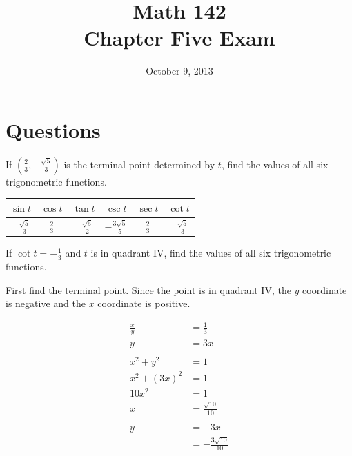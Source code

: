 \documentclass[fleqn,addpoints]{exam}
\author{}
\date{October 9, 2013}
\title{Math 142 \\ Chapter Five Exam}
\begin{document}
  \maketitle


  \section{Questions}

  \begin{questions}
    
    \question[6]
      If $\left( \frac{2}{3}, - \frac{\sqrt{5}}{3} \right)$ is the terminal point determined by $t$, find the values of
      all six trigonometric functions. 
      
      \begin{solution}
        \begin{tabular}[H]{cccccc}
          \toprule
          $\sin t$               & $\cos t$      & $\tan t$               & $\csc t$                 & $\sec t$      & $\cot t$ \\
          \midrule
          $- \frac{\sqrt{5}}{3}$ & $\frac{2}{3}$ & $- \frac{\sqrt{5}}{2}$ & $- \frac{3 \sqrt{5}}{5}$ & $\frac{2}{3}$ & $- \frac{\sqrt{5}}{3}$ \\
          \bottomrule
        \end{tabular}
      \end{solution}

    \question[8]
      If $\cot t = - \frac{1}{3}$ and $t$ is in quadrant IV, find the values of all six trigonometric functions.

      \begin{solution}
        First find the terminal point.  Since the point is in quadrant IV, the $y$ coordinate is negative and the $x$
        coordinate is positive.

        \begin{align*}
          \frac{x}{y}  & = \frac{1}{3} \\
          y            & = 3x \\
          \\
          x^2 + y^2    & = 1 \\
          x^2 + (3x)^2 & = 1 \\
          10 x^2       & = 1 \\
          x            & = \frac{\sqrt{10}}{10} \\
          \\
          y            & = -3x \\
                       & = -\frac{3 \sqrt{10}}{10}  \\
        \end{align*}


\end{solution}
\end{questions}
\end{document}
